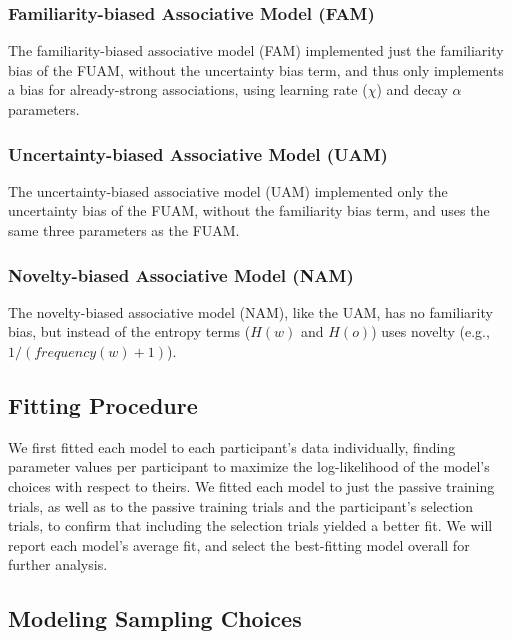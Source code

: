 \documentclass[10pt, letterpaper]{article}
\begin{document}
\subsubsection{Familiarity-biased Associative Model
(FAM)}\label{familiarity-biased-associative-model-fam}

The familiarity-biased associative model (FAM) implemented just the
familiarity bias of the FUAM, without the uncertainty bias term, and
thus only implements a bias for already-strong associations, using
learning rate (\(\chi\)) and decay \(\alpha\) parameters.

\subsubsection{Uncertainty-biased Associative Model
(UAM)}\label{uncertainty-biased-associative-model-uam}

The uncertainty-biased associative model (UAM) implemented only the
uncertainty bias of the FUAM, without the familiarity bias term, and
uses the same three parameters as the FUAM.

\subsubsection{Novelty-biased Associative Model
(NAM)}\label{novelty-biased-associative-model-nam}

The novelty-biased associative model (NAM), like the UAM, has no
familiarity bias, but instead of the entropy terms (\(H(w)\) and
\(H(o)\)) uses novelty (e.g., \(1/(frequency(w)+1)\)).

\subsection{Fitting Procedure}\label{fitting-procedure}

We first fitted each model to each participant's data individually,
finding parameter values per participant to maximize the log-likelihood
of the model's choices with respect to theirs. We fitted each model to
just the passive training trials, as well as to the passive training
trials and the participant's selection trials, to confirm that including
the selection trials yielded a better fit. We will report each model's
average fit, and select the best-fitting model overall for further
analysis.

\subsection{Modeling Sampling Choices}\label{modeling-sampling-choices}
\end{document}
